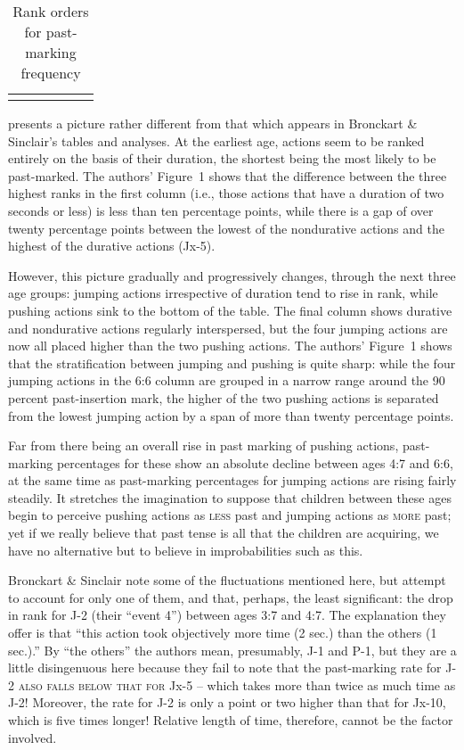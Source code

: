 \begin{table}
\begin{center}
\begin{tabular}{cccccc}
			\lspbottomrule
		\end{tabular}
	\end{center}
	\caption{Rank orders for past-marking frequency}\label{tab:3.3}
\end{table}


 presents a picture rather different from that which appears in Bronckart \& Sinclair's tables and analyses. At the earliest age, actions seem to be ranked entirely on the basis of their duration, the shortest being the most likely to be past-marked. The authors' Figure~1 shows that the difference between the three highest ranks in the first column (i.e., those actions that have a duration of two seconds or less) is less than ten percentage points, while there is a gap of over twenty percentage points between the lowest of the nondurative actions and the highest of the durative actions (Jx-5).

However, this picture gradually and progressively changes, through the next three age groups: jumping actions irrespective of duration tend to rise in rank, while pushing actions sink to the bottom of the table. The final column shows durative and nondurative actions regularly interspersed, but the four jumping actions are now all placed higher than the two pushing actions. The authors' Figure~1 shows that the stratification between jumping and pushing is quite sharp: while the
four jumping actions in the 6:6 column are grouped in a narrow range around the 90 percent past-insertion mark, the higher of the two pushing actions is separated from the lowest jumping action by a span of more than twenty percentage points.

Far from there being an overall rise in past marking of pushing actions, past-marking percentages for these show an absolute decline between ages 4:7 and 6:6, at the same time as past-marking percentages for jumping actions are rising fairly steadily. It stretches the imagina\-tion to suppose that children between these ages begin to perceive pushing actions as \textsc{less} past and jumping actions as \textsc{more} past; yet if we really believe that past tense is all that the children are acquiring, we have no alternative but to believe in improbabilities such as this.

Bronckart \& Sinclair note some of the fluctuations mentioned here, but attempt to account for only one of them, and that, perhaps, the least significant: the drop in rank for J-2 (their ``event 4'') be\-tween ages 3:7 and 4:7. The explanation they offer is that ``this action took objectively more time (2 sec.) than the others (1 sec.).'' By ``the others'' the authors mean, presumably, J-1 and P-1, but they are a little disingenuous here because they fail to note that the past-marking rate for J-2 \textsc{also falls below that for} Jx-5 -- which takes more than twice as much time as J-2! Moreover, the rate for J-2 is only a point or two higher than that for Jx-10, which is five times longer! Relative length of time, therefore, cannot be the factor involved.

